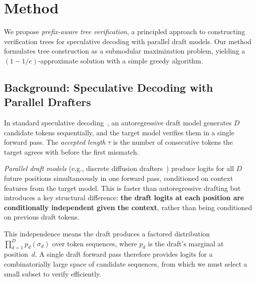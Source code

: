 
\newtheorem{definition}{Definition}
\newtheorem{proposition}{Proposition}
\newtheorem{corollary}{Corollary}
\newtheorem{remark}{Remark}

\section{Method}
\label{sec:method}

We propose \emph{prefix-aware tree verification}, a principled approach
to constructing verification trees for speculative decoding with parallel
draft models.  Our method formulates tree construction as a submodular
maximization problem, yielding a $(1 - 1/e)$-approximate solution with
a simple greedy algorithm.

\subsection{Background: Speculative Decoding with Parallel Drafters}
\label{sec:background}

In standard speculative decoding~\citep{leviathan2023,chen2023}, an
autoregressive draft model generates $D$ candidate tokens sequentially,
and the target model verifies them in a single forward pass.  The
\emph{accepted length} $\tau$ is the number of consecutive tokens the
target agrees with before the first mismatch.

\emph{Parallel draft models} (e.g., discrete diffusion
drafters~\citep{dflash}) produce logits for all $D$ future positions
simultaneously in one forward pass, conditioned on context features from
the target model.  This is faster than autoregressive drafting but
introduces a key structural difference: \textbf{the draft logits at each
position are conditionally independent given the context}, rather than
being conditioned on previous draft tokens.

This independence means the draft produces a factored distribution
$\prod_{d=1}^{D} p_d(\sigma_d)$ over token sequences, where $p_d$ is
the draft's marginal at position~$d$.  A single draft forward pass
therefore provides logits for a combinatorially large space of candidate
sequences, from which we must select a small subset to verify
efficiently.

